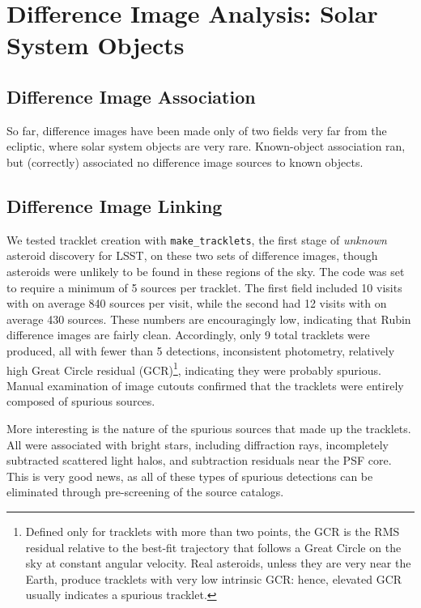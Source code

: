 \usepackage{graphicx}
\section{Difference Image Analysis: Solar System Objects}
\label{sec:dia_solar_system}

\subsection{Difference Image Association}
\label{sec:dia_solar_system_assoc}

So far, difference images have been made only of two fields very far from the ecliptic, where solar system objects are very rare. Known-object association ran, but (correctly) associated no difference image sources to known objects. 

\subsection{Difference Image Linking}
\label{sec:dia_solar_system_link}

We tested tracklet creation with {\tt make\_tracklets}, the first stage of {\em unknown} asteroid discovery for LSST, on these two sets of difference images, though asteroids were unlikely to be found in these regions of the sky. The code was set to require a minimum of 5 sources per tracklet. The first field included 10 visits with on average 840 sources per visit, while the second had 12 visits with on average 430 sources. These numbers are encouragingly low, indicating that Rubin difference images are fairly clean. Accordingly, only 9 total tracklets were produced, all with fewer than 5 detections, inconsistent photometry, relatively high Great Circle residual (GCR)\footnote{Defined only for tracklets with more than two points, the GCR is the RMS residual relative to the best-fit trajectory that follows a Great Circle on the sky at constant angular velocity. Real asteroids, unless they are very near the Earth, produce tracklets with very low intrinsic GCR: hence, elevated GCR usually indicates a spurious tracklet.}, indicating they were probably spurious. Manual examination of image cutouts confirmed that the tracklets were entirely composed of spurious sources. 

More interesting is the nature of the spurious sources that made up the tracklets. All were associated with bright stars, including diffraction rays, incompletely subtracted scattered light halos, and subtraction residuals near the PSF core. This is very good news, as all of these types of spurious detections can be eliminated through pre-screening of the source catalogs. 

